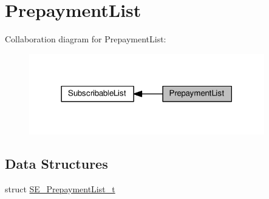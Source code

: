 \hypertarget{group__PrepaymentList}{}\section{Prepayment\+List}
\label{group__PrepaymentList}
Collaboration diagram for Prepayment\+List\+:\nopagebreak
\begin{figure}[H]
\begin{center}
\leavevmode
\includegraphics[width=290pt]{group__PrepaymentList}
\end{center}
\end{figure}
\subsection*{Data Structures}
\begin{DoxyCompactItemize}
\item 
struct \hyperlink{structSE__PrepaymentList__t}{S\+E\+\_\+\+Prepayment\+List\+\_\+t}
\end{DoxyCompactItemize}
